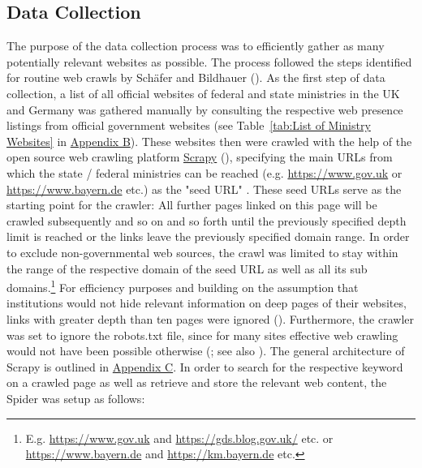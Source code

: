 \subsection{Data Collection}
The purpose of the data collection process was to efficiently gather as many potentially relevant websites as possible. The process followed the steps identified for routine web crawls by Schäfer and Bildhauer (\cite*{Schafer2012}). As the first step of data collection, a list of all official websites of federal and state ministries in the UK and Germany was gathered manually by consulting the respective web presence listings from official government websites (see Table~\ref{tab:List of Ministry Websites} in \href{Appendix B}{Appendix B}). These websites then were crawled with the help of the open source web crawling platform \href{https://scrapy.org }{Scrapy} (\cite{Kouzis-Loukas2016}), specifying the main URLs from which the state / federal ministries can be reached (e.g. \url{https://www.gov.uk} or \url{https://www.bayern.de} etc.) as the "seed URL" \parencite[p. 115]{Barbaresi2015}. These seed URLs serve as the starting point for the crawler: All further pages linked on this page will be crawled subsequently and so on and so forth until the previously specified depth limit is reached or the links leave the previously specified domain range. In order to exclude non-governmental web sources, the crawl was limited to stay within the range of the respective domain of the seed URL as well as all its sub domains.\footnote{E.g. \url{https://www.gov.uk} and \url{https://gds.blog.gov.uk/} etc. or \url{https://www.bayern.de} and \url{https://km.bayern.de} etc.} For efficiency purposes and building on the assumption that institutions would not hide relevant information on deep pages of their websites, links with greater depth than ten pages were ignored (\cite{Scrapy2018, Wang2019}). Furthermore, the crawler was set to ignore the robots.txt file, since for many sites effective web crawling would not have been possible otherwise (\cite{Sun2007}; see also \cite[p. 125]{Barbaresi2015}). The general architecture of Scrapy is outlined in \href{Appendix C}{Appendix C}. In order to search for the respective keyword on a crawled page as well as retrieve and store the relevant web content, the Spider was setup as follows:
%
